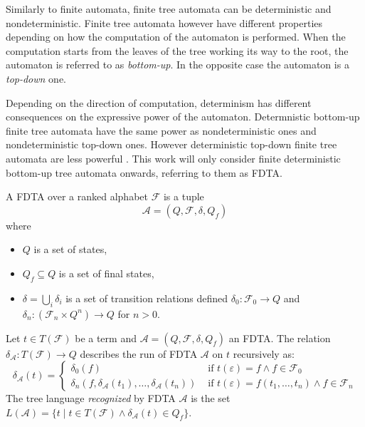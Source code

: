 Similarly to finite automata, finite tree automata can be deterministic and nondeterministic. Finite tree automata however have different properties depending on how the computation of the automaton is performed. When the computation starts from the leaves of the tree working its way to the root, the automaton is referred to as \emph{bottom-up}. In the opposite case the automaton is a \emph{top-down} one.

Depending on the direction of computation, determinism has different consequences on the expressive power of the automaton. Determnistic bottom-up finite tree automata have the same power as nondeterministic ones and nondeterministic top-down ones. However deterministic top-down finite tree automata are less powerful \cite{tata07}. This work will only consider finite deterministic bottom-up tree automata onwards, referring to them as FDTA.

\begin{defn}
A FDTA over a ranked alphabet $\mathcal{F}$ is a tuple $$\mathcal{A} = (Q, \mathcal{F}, \delta, Q_f)$$ where
\begin{itemize}
    \item $Q$ is a set of states,
    \item $Q_f \subseteq Q$ is a set of final states,
    \item $\delta = \bigcup_i\delta_i$ is a set of transition relations defined $\delta_0:\mathcal{F}_0 \rightarrow Q$ and $\delta_n:(\mathcal{F}_n \times Q^n) \rightarrow Q$ for $n > 0$.
\end{itemize}
\end{defn}

\begin{defn}
Let $t \in T(\mathcal{F})$ be a term and $\mathcal{A} = (Q, \mathcal{F}, \delta, Q_f)$ an FDTA. The relation $\delta_{\mathcal{A}} : T(\mathcal{F}) \rightarrow Q$ describes the run of FDTA $\mathcal{A}$ on $t$ recursively as:
\begin{equation*}
    \delta_{\mathcal{A}}(t) = 
    \begin{cases}
        \delta_0(f) & \text{ if } t(\varepsilon)=f \wedge f \in \mathcal{F}_0\\
        \delta_n(f, \delta_{\mathcal{A}}(t_1), \dots, \delta_{\mathcal{A}}(t_n)) & \text{ if } t(\varepsilon)=f(t_1, \dots, t_n) \wedge f \in \mathcal{F}_n
    \end{cases}
\end{equation*} 
The tree language \emph{recognized} by FDTA $\mathcal{A}$ is the set $L(\mathcal{A}) = \{t\; | \; t \in T(\mathcal{F}) \wedge \delta_{\mathcal{A}}(t) \in Q_f\}$.
\end{defn}

